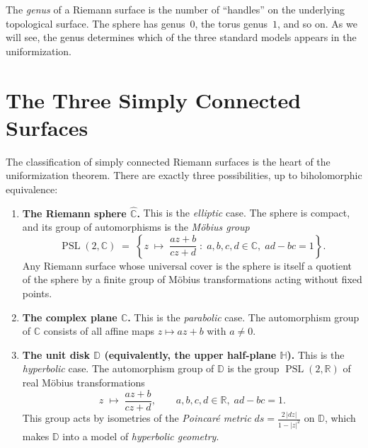 \begin{remark}
The \emph{genus} of a Riemann surface is the number of ``handles'' on the underlying topological surface. The sphere has genus~$0$, the torus genus~$1$, and so on. As we will see, the genus determines which of the three standard models appears in the uniformization.
\end{remark}

\section{The Three Simply Connected Surfaces}

The classification of simply connected Riemann surfaces is the heart of the uniformization theorem. There are exactly three possibilities, up to biholomorphic equivalence:

\begin{enumerate}
    \item \textbf{The Riemann sphere $\widehat{\mathbb{C}}$.}\; This is the \emph{elliptic} case. The sphere is compact, and its group of automorphisms is the \emph{M\"obius group}
    \[
        \operatorname{PSL}(2,\mathbb{C}) \;=\; \left\{ z \;\mapsto\; \frac{az + b}{cz + d} \;:\; a,b,c,d \in \mathbb{C},\; ad - bc = 1 \right\}.
    \]
    Any Riemann surface whose universal cover is the sphere is itself a quotient of the sphere by a finite group of M\"obius transformations acting without fixed points.

    \item \textbf{The complex plane $\mathbb{C}$.}\; This is the \emph{parabolic} case. The automorphism group of $\mathbb{C}$ consists of all affine maps $z \mapsto az + b$ with $a \neq 0$.

    \item \textbf{The unit disk $\mathbb{D}$ (equivalently, the upper half-plane $\mathbb{H}$).}\; This is the \emph{hyperbolic} case. The automorphism group of $\mathbb{D}$ is the group $\operatorname{PSL}(2,\mathbb{R})$ of real M\"obius transformations
    \[
        z \;\mapsto\; \frac{az + b}{cz + d}, \qquad a,b,c,d \in \mathbb{R},\; ad - bc = 1.
    \]
    This group acts by isometries of the \emph{Poincar\'e metric} $ds = \frac{2\,|dz|}{1 - |z|^2}$ on $\mathbb{D}$, which makes $\mathbb{D}$ into a model of \emph{hyperbolic geometry}.
\end{enumerate}

